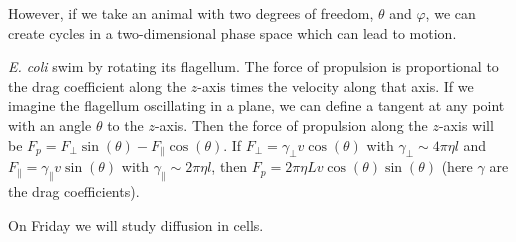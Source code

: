 \documentclass[a4paper,twoside,master.tex]{subfiles}
\begin{document}
However, if we take an animal with two degrees of freedom, $ \theta $ and $ \varphi $, we can create cycles in a two-dimensional phase space which can lead to motion.

\textit{E. coli} swim by rotating its flagellum. The force of propulsion is proportional to the drag coefficient along the $ z $-axis times the velocity along that axis. If we imagine the flagellum oscillating in a plane, we can define a tangent at any point with an angle $ \theta $ to the $ z $-axis. Then the force of propulsion along the $ z $-axis will be $ F_p = F_{\perp} \sin(\theta) - F_{\parallel} \cos(\theta) $. If $ F_{\perp} = \gamma_{\perp} v \cos(\theta) $ with $ \gamma_{\perp} \sim 4 \pi \eta l $ and $ F_{\parallel} = \gamma_{\parallel} v \sin(\theta) $ with $ \gamma_{\parallel} \sim 2 \pi \eta l $, then $ F_p = 2 \pi \eta L v \cos(\theta) \sin(\theta) $ (here $ \gamma $ are the drag coefficients).

On Friday we will study diffusion in cells.
\end{document}
